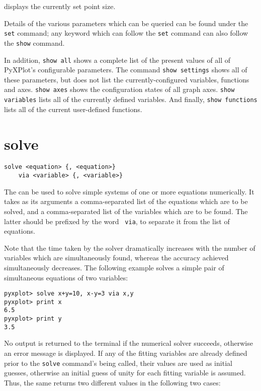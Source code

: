 \noindent displays the currently set point size.

Details of the various parameters which can be queried can be found under the
{\tt set} command; any keyword which can follow the {\tt set} command can also
follow the {\tt show} command.

In addition, {\tt show all} shows a complete list of the present values of all
of PyXPlot's configurable parameters.  The command {\tt show settings} shows
all of these parameters, but does not list the currently-configured variables,
functions and axes. {\tt show axes} shows the configuration states of all graph
axes. {\tt show variables} lists all of the currently defined variables. And
finally, {\tt show functions} lists all of the current user-defined functions.


\section{solve}

\begin{verbatim}
solve <equation> {, <equation>}
    via <variable> {, <variable>}
\end{verbatim}

The  can be used to solve simple systems of one or more
equations numerically. It takes as its arguments a comma-separated list of the
equations which are to be solved, and a comma-separated list of the variables
which are to be found. The latter should be prefixed by the word {\tt
via}, to separate it from the list of equations.

Note that the time taken by the solver dramatically increases with the number
of variables which are simultaneously found, whereas the accuracy achieved
simultaneously decreases. The following example solves a simple pair of
simultaneous equations of two variables:

\begin{verbatim}
pyxplot> solve x+y=10, x-y=3 via x,y
pyxplot> print x
6.5
pyxplot> print y
3.5
\end{verbatim}

\noindent No output is returned to the terminal if the numerical solver
succeeds, otherwise an error message is displayed. If any of the fitting
variables are already defined prior to the {\tt solve} command's being called,
their values are used as initial guesses, otherwise an initial guess of unity
for each fitting variable is assumed. Thus, the same  returns
two different values in the following two cases:


